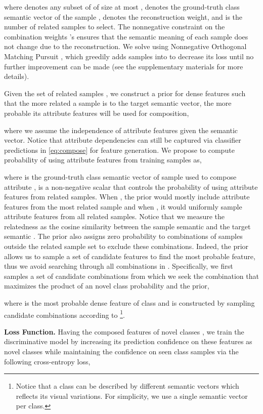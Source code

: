 \documentclass[10pt,journal,compsoc]{IEEEtran}
\newcommand{\1}{\boldsymbol{1}}
\newcommand{\0}{\boldsymbol{0}}
\newcommand{\<}{\langle}
\renewcommand{\>}{\rangle}
\newcommand{\myparagraph}[1]{\vspace{-2pt}\medskip\noindent\textbf{#1}}
\begin{document}
where  denotes any subset of  of size at most ,  denotes the ground-truth class semantic vector of the sample ,  denotes the reconstruction weight, and  is the number of related samples to select. The nonnegative constraint on the combination weights 's ensures that the semantic meaning of each sample does not change due to the reconstruction.
We solve  using Nonnegative Orthogonal Matching Pursuit \cite{Lin:ICML14}, which greedily adds samples into  to decrease its loss until no further improvement can be made (see the supplementary materials for more details). 

Given the set of related samples , we construct a prior for dense features such that the more related a sample is to the target semantic vector, the more probable its attribute features will be used for composition,

where we assume the independence of attribute features given the semantic vector.
Notice that attribute dependencies can still be captured via classifier predictions  in \eqref{eq:compose} for feature generation.
We propose to compute probability of using attribute features from training samples as,

where  is the ground-truth class semantic vector of sample  used to compose attribute ,  is a non-negative scalar that controls the probability of using attribute features from related samples. When , the prior would mostly include attribute features from the most related sample and  when , it would uniformly sample attribute features from all related samples. Notice that we measure the relatedness as the cosine similarity between the sample semantic  and the target semantic .
The prior also assigns zero probability to combinations of samples outside the related sample set  to exclude these combinations.
Indeed, the prior allows us to sample a set of candidate features to find the most probable feature, thus we avoid searching through all combinations in . Specifically, we first samples a set of candidate combinations  from which we seek the combination that maximizes the product of an novel class probability and the prior, 

where  is the most probable dense feature of class  and  is constructed by sampling  candidate combinations according to \footnote{Notice that a class can be described by different semantic vectors which reflects its visual variations. For simplicity, we use a single semantic vector per class.}.

\myparagraph{Loss Function.}
Having the composed features of novel classes , we train the discriminative model by increasing its prediction confidence on these features as novel classes while maintaining the confidence on seen class samples via the following cross-entropy loss,
\end{document}
